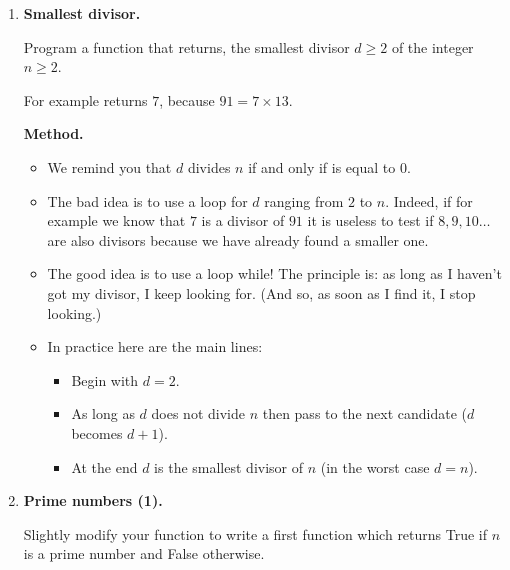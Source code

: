 \documentclass[11pt,class=report,crop=false]{standalone}
\begin{document}
\begin{activite}



\begin{enumerate}
  \item \textbf{Smallest divisor.}
  
  Program a function  that returns, the smallest divisor $d\ge2$ of the integer $n\ge2$.
  
  For example  returns $7$, because $91 = 7 \times 13$.
  
  \medskip
  
  \textbf{Method.}
  \begin{itemize}
    \item We remind you that $d$ divides $n$ if and only if  is equal to $0$.
    \item The bad idea is to use a loop \og{}for $d$ ranging from $2$ to $n$\fg{}. Indeed, if for example we know that $7$ is a divisor of $91$ it is useless to test if $8,9,10\ldots$ are also divisors because we have already found a smaller one.
    
    \item The good idea is to use a loop \og{}while\fg{}!
    The principle is: \og{}as long as I haven't got my divisor, I keep looking for\fg{}. (And so, as soon as I find it, I stop looking.)
    
    \item In practice here are the main lines:
    \begin{itemize}
      \item Begin with $d=2$.
      \item As long as $d$ does not divide $n$ then pass to the next candidate ($d$ becomes $d+1$).
      \item At the end $d$ is the smallest divisor of $n$ (in the worst case $d=n$).
     \end{itemize} 
  \end{itemize}
  
  
  \item \textbf{Prime numbers (1).}
  
  Slightly modify your function  to write a first function  which returns \og{}True\fg{} if $n$ is a prime number and \og{}False\fg{} otherwise.
  

\end{enumerate}
\end{activite}
\end{document}
